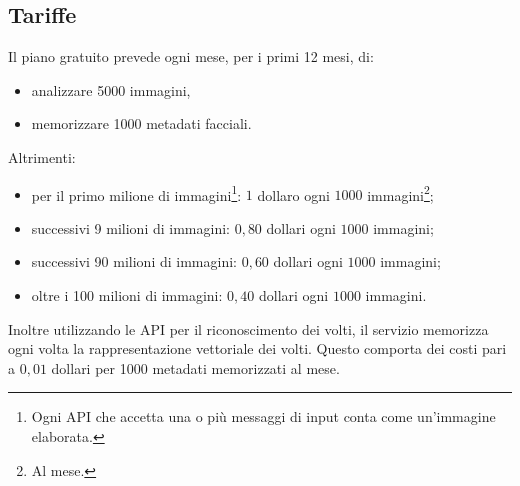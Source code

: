 \subsection{Tariffe}
Il piano gratuito prevede ogni mese, per i primi 12 mesi, di:
\begin{itemize}
\item analizzare 5000 immagini,
\item memorizzare 1000 metadati facciali.
\end{itemize}
Altrimenti:
\begin{itemize}
\item per il primo milione di immagini\footnote{Ogni API che accetta una o più messaggi di input conta come un'immagine elaborata.}: $1$ dollaro ogni $1000$ immagini\footnote{Al mese.};
\item successivi 9 milioni di immagini: $0,80$ dollari ogni $1000$ immagini;
\item successivi 90 milioni di immagini: $0,60$ dollari ogni $1000$ immagini;
\item oltre i 100 milioni di immagini: $0,40$ dollari ogni $1000$ immagini.
\end{itemize}
Inoltre utilizzando le API per il riconoscimento dei volti, il servizio memorizza ogni volta la rappresentazione vettoriale dei volti. Questo comporta dei costi pari a $0,01$ dollari per 1000 metadati memorizzati al mese.  